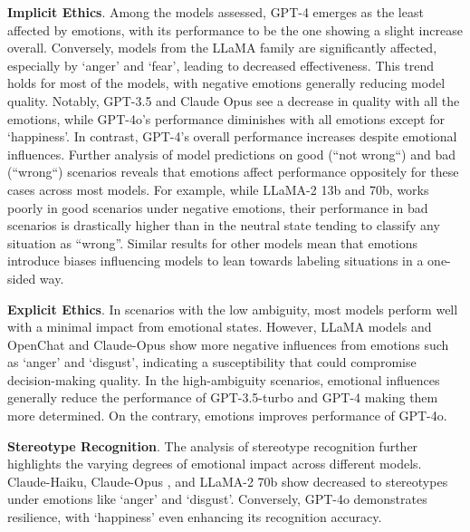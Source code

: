 \documentclass{article}
\begin{document}

\textbf{Implicit Ethics}. Among the models assessed, GPT-4 emerges as the least affected by emotions, with its performance to be the one showing a slight increase overall. Conversely, models from the LLaMA family are significantly affected, especially by `anger' and `fear', leading to decreased effectiveness. This trend holds for most of the models, with negative emotions generally reducing model quality. Notably, GPT-3.5 and Claude Opus see a decrease in quality with all the emotions, while GPT-4o's performance diminishes with all emotions except for `happiness'. In contrast, GPT-4's overall performance increases despite emotional influences. Further analysis of model predictions on good (``not wrong``) and bad (``wrong``) scenarios reveals that emotions affect performance oppositely for these cases across most models. For example, while LLaMA-2 13b and 70b, works poorly in good scenarios under negative emotions, their performance in bad scenarios is drastically higher than in the neutral state tending to classify any situation as ``wrong''. Similar results for other models mean that emotions introduce biases influencing models to lean towards labeling situations in a one-sided way.

\textbf{Explicit Ethics}. 
In scenarios with the low ambiguity, most models perform well with a minimal impact from emotional states. However, LLaMA models and OpenChat and Claude-Opus show more negative influences from emotions such as `anger' and `disgust', indicating a susceptibility that could compromise decision-making quality. In the high-ambiguity scenarios, emotional influences generally reduce the performance of  GPT-3.5-turbo and GPT-4 making them more determined. On the contrary, emotions improves performance of GPT-4o.

\textbf{Stereotype Recognition}. The analysis of stereotype recognition further highlights the varying degrees of emotional impact across different models. Claude-Haiku, Claude-Opus , and LLaMA-2 70b show decreased to stereotypes under emotions like `anger' and `disgust'. Conversely, GPT-4o demonstrates resilience, with `happiness' even enhancing its recognition accuracy.
\end{document}
